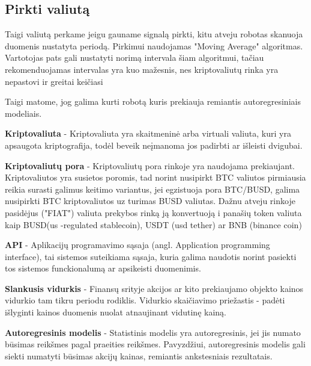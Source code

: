 \documentclass{VUMIFInfKursinis}
\begin{document}
\subsection{Pirkti valiutą}
Taigi valiutą perkame jeigu gauname signalą pirkti, kitu atveju robotas skanuoja duomenis nustatyta periodą. Pirkimui naudojamas "Moving Average" algoritmas. 
Vartotojas pats gali nustatyti norimą intervala šiam algoritmui, tačiau rekomenduojamas intervalas yra kuo mažesnis, nes kriptovaliutų rinka 
yra nepastovi ir greitai keičiasi 


Taigi matome, jog galima kurti robotą kuris prekiauja remiantis autoregresiniais modeliais.

\textbf{Kriptovaliuta} - Kriptovaliuta yra skaitmeninė arba virtuali valiuta, kuri yra apsaugota kriptografija, todėl beveik neįmanoma jos padirbti ar išleisti dvigubai.

\textbf{Kriptovaliutų pora} - Kriptovaliutų pora rinkoje yra naudojama prekiaujant. Kriptovaliutos yra susietos poromis, tad norint nusipirkt BTC valiutos pirmiausia reikia surasti 
galimus keitimo variantus, jei egzistuoja pora BTC/BUSD, galima nusipirkti BTC kriptovaliutos uz turimas BUSD valiutas. Dažnu atveju rinkoje pasidėjus ("FIAT") valiuta
prekybos rinką ją konvertuoją i panašių token valiuta kaip BUSD(us -regulated stablecoin), USDT (usd tether) ar BNB (binance coin)

\textbf{API} - Aplikacijų programavimo sąsaja (angl. Application programming interface), tai sistemos suteikiama sąsaja, kuria galima naudotis norint pasiekti tos sistemos
funckionalumą ar apsikeisti duomenimis.

\textbf{Slankusis vidurkis} - Finansų srityje akcijos ar kito prekiaujamo objekto kainos vidurkio tam tikru periodu rodiklis. Vidurkio skaičiavimo priežastis - padėti išlyginti
kainos duomenis nuolat atnaujinant vidutinę kainą.

\textbf{Autoregresinis modelis} - Statistinis modelis yra autoregresinis, jei jis numato būsimas reikšmes pagal praeities reikšmes. Pavyzdžiui, autoregresinis modelis gali
siekti numatyti būsimas akcijų kainas, remiantis ankstesniais rezultatais.
\end{document}
